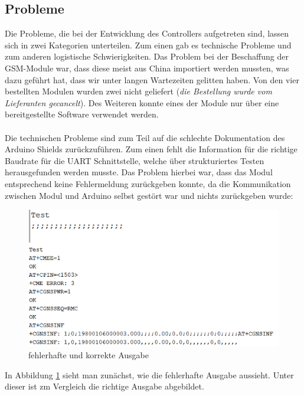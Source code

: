 \subsection{Probleme}
Die Probleme, die bei der Entwicklung des Controllers aufgetreten sind, lassen sich in zwei Kategorien unterteilen. Zum einen gab es technische Probleme und zum anderen logistische Schwierigkeiten.
Das Problem bei der Beschaffung der GSM-Module war, dass diese meist aus China importiert werden mussten, was dazu geführt hat, dass wir unter langen Wartezeiten gelitten haben. Von den vier bestellten Modulen wurden zwei nicht geliefert (\textit{die Bestellung wurde vom Lieferanten gecancelt}). Des Weiteren konnte eines der Module nur über eine bereitgestellte Software verwendet werden.
\\
\\
Die technischen Probleme sind zum Teil auf die schlechte Dokumentation des Arduino Shields zurückzuführen. Zum einen fehlt die Information für die richtige Baudrate für die UART Schnittstelle, welche über strukturiertes Testen herausgefunden werden musste. Das Problem hierbei war, dass das Modul entsprechend keine Fehlermeldung zurückgeben konnte, da die Kommunikation zwischen Modul und Arduino selbst gestört war und  nichts zurückgeben wurde:
\begin{figure} [H]
	\begin{center}
		\includegraphics[width=1\textwidth]{Bilder/Arduino_Probleme.png}
		\caption{fehlerhafte und korrekte Ausgabe}
		\label{Arduinoproblem}
	\end{center}
\end{figure}
In Abbildung \ref{Arduinoproblem} sieht man zunächst, wie die fehlerhafte Ausgabe aussieht. Unter dieser ist zm Vergleich die richtige Ausgabe abgebildet.
\\
\\

